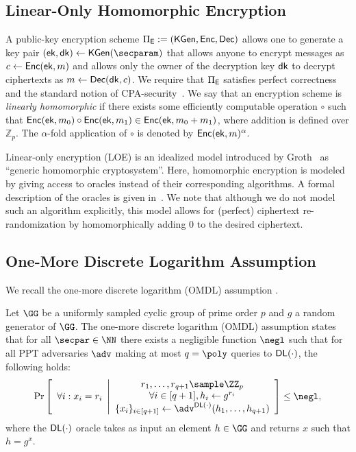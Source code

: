 \subsection{Linear-Only Homomorphic Encryption} 

A public-key encryption scheme $\Pi_{\mathsf{E}}:= ({\mathsf{KGen}}, {\mathsf{Enc}}, {\mathsf{Dec}})$ allows one to generate a key pair $(\ek, \dk) \gets \kgen(\secparam)$ that allows anyone to encrypt messages as $c \gets {\mathsf{Enc}}(\mathsf{ek}, m)$ and allows only the owner of the decryption key $\mathsf{dk}$ to decrypt ciphertexts as $m \gets {\mathsf{Dec}}(\mathsf{dk}, c)$. We require that  $\Pi_{\mathsf{E}}$ satisfies perfect correctness and the standard notion of CPA-security~\cite{STOC:GolMic82}.
We say that an encryption scheme is \emph{linearly homomorphic} if there exists some efficiently computable operation $\circ$ such that ${\mathsf{Enc}}(\mathsf{ek}, m_0) \circ {\mathsf{Enc}}(\mathsf{ek}, m_1) \in {\mathsf{Enc}}(\mathsf{ek}, m_0 + m_1)$, where addition is defined over $\mathbb{Z}_p$. The $\alpha$-fold application of $\circ$ is denoted by ${\mathsf{Enc}}(\mathsf{ek}, m)^\alpha$. 

Linear-only encryption (LOE) is an idealized model introduced by Groth~\cite{TCC:Groth04} as ``generic homomorphic cryptosystem''. Here, homomorphic encryption is modeled by giving access to oracles instead of their corresponding algorithms. A formal description of the oracles is given  in~. We note that although we do not model such an algorithm explicitly, this model allows for (perfect) ciphertext re-randomization by homomorphically adding $0$ to the desired ciphertext.


\subsection{One-More Discrete Logarithm Assumption} 
We recall the one-more discrete logarithm (OMDL) assumption \cite{JC:BNPS03,EPRINT:BauFucPlo21}.

\begin{definition}\label{def:omdl}
Let $\GG$ be a uniformly sampled cyclic group of prime order $p$ and $g$ a random generator of $\GG$. The one-more discrete logarithm (OMDL) assumption states that for all $\secpar \in \NN$ there exists a negligible function $\negl$ such that for all PPT adversaries $\adv$ making at most $q = \poly$ queries to ${\mathsf{DL}}(\cdot)$, the following holds:
\begin{align*}
\Pr\left[ \begin{array}{c}
   \forall i: x_i = r_i
\end{array}
\middle|
\begin{array}{c}
    r_1, \ldots, r_{q+1} \sample \ZZ_p\\
    \forall i \in [q+1], h_i \gets g^{r_i}\\
    \{x_i \}_{i \in [q+1]} \gets \adv^{\DL(\cdot)}(h_1, \ldots, h_{q+1})
\end{array}
\right]
\le \negl,
\end{align*}
where the ${\mathsf{DL}}(\cdot)$ oracle takes as input an element $h \in \GG$ and returns $x$ such that $h = g^x$.
\end{definition}
